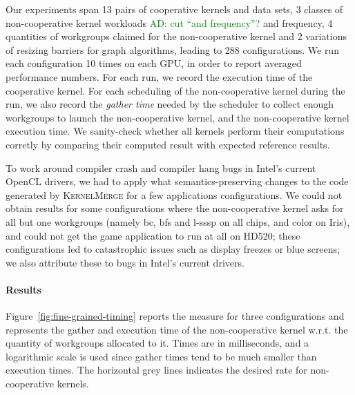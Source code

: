 \documentclass[numbers,nocopyrightspace,10pt]{sigplanconf}
\newcommand{\ADComment}[1]{\textcolor{green}{AD: #1}}
\newcommand{\kernelmerge}{\textsc{KernelMerge}}
\newcommand{\myfiglong}{Figure~}
\begin{document}
Our experiments span 13 pairs of cooperative kernels and data sets, 3
classes of non-cooperative kernel workloads \ADComment{cut ``and frequency''?} and frequency, 4 quantities
of workgroups claimed for the non-cooperative kernel and 2 variations of
resizing barriers for graph algorithms, leading to 288
configurations.  We run each configuration 10 times on each
GPU, in order to report averaged performance numbers. For each run, we record the execution time of the cooperative
kernel. For each scheduling of the non-cooperative kernel during the
run, we also record the \emph{gather time} needed by the scheduler to
collect enough workgroups to launch the non-cooperative kernel, and the
non-cooperative kernel execution time. We sanity-check whether all kernels perform
their computations corretly by comparing their computed result with expected reference results.

To work around compiler crash and compiler hang bugs in Intel's current OpenCL drivers, we had to apply what semantics-preserving changes to the code generated by \kernelmerge{} for a few applications configurations.  We could not obtain results for some configurations where the non-cooperative kernel asks
for all but one workgroups (namely bc, bfs and l-sssp on all chips, and
color on Iris), and could not get the game application to run at all on HD520; these configurations led to 
catastrophic issues such as display freezes or blue screens; we also attribute these to bugs in Intel's current drivers.


\paragraph{Results}

\myfiglong\ref{fig:fine-grained-timing} reports the measure for three
configurations and represents the gather and execution time of the
non-cooperative kernel w.r.t. the quantity of workgroups allocated to
it. Times are in milliseconds, and a logarithmic scale is used since
gather times tend to be much smaller than execution times. The
horizontal grey lines indicates the desired rate for non-cooperative
kernels.
\end{document}
